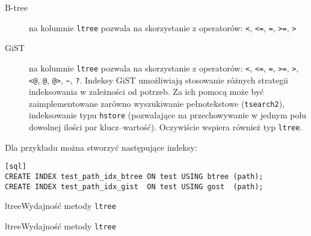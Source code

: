 
\begin{description}
    \item[B-tree] na kolumnie \texttt{ltree} pozwala na skorzystanie z operatorów: \verb|<|, \verb|<=|, \verb|=|, \verb|>=|, \verb|>|
    \item[GiST] na kolumnie \texttt{ltree} pozwala na skorzystanie z operatorów: 
        \verb|<|, \verb|<=|, \verb|=|, \verb|>=|, \verb|>|, \verb|<@|, \verb|@|, \verb|@>|, \verb|~|, \verb|?|.
        Indeksy GiST  umożliwiają stosowanie różnych strategii indeksowania w zależności od potrzeb.
        Za ich pomocą może być zaimplementowane zarówno wyszukiwanie pełnotekstowe (\texttt{tsearch2}), 
        indeksowanie typu \texttt{hstore} (pozwalające na przechowywanie w jednym polu dowolnej ilości par klucz--wartość).
        Oczywiście wspiera również typ \texttt{ltree}.
\end{description}

Dla przykładu można stworzyć następujące indeksy:
\begin{verbatim}[sql]
CREATE INDEX test_path_idx_btree ON test USING btree (path);
CREATE INDEX test_path_idx_gist  ON test USING gost  (path);
\end{verbatim}













\begin{qxtab}{ltree}{Wydajność metody \texttt{ltree}}
\end{qxtab}

\begin{qxfig}{ltree}{Wydajność metody \texttt{ltree}}
\end{qxfig}







